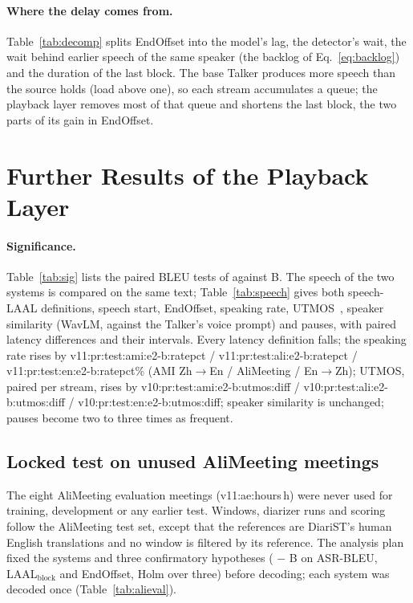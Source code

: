 \paragraph{Where the delay comes from.} Table~\ref{tab:decomp} splits EndOffset into the model's lag, the detector's
wait, the wait behind earlier speech of the same speaker (the backlog of Eq.~\eqref{eq:backlog}) and the duration of the
last block. The base Talker produces more speech than the source holds (load above one), so each stream accumulates a
queue; the playback layer removes most of that queue and shortens the last block, the two parts of its gain in
EndOffset.



\section{Further Results of the Playback Layer}
\label{app:sig10}
\label{app:postreview}

\paragraph{Significance.} Table~\ref{tab:sig} lists the paired BLEU tests of \sys{} against B. The speech of the two
systems is compared on the same text; Table~\ref{tab:speech} gives both speech-LAAL definitions, speech start,
EndOffset, speaking rate, UTMOS~\citep{saeki2022utmos}, speaker similarity (WavLM, against the Talker's voice prompt)
and pauses, with paired latency differences and their intervals. Every latency definition falls; the speaking rate rises
by \num{v11:pr:test:ami:e2-b:ratepct} / \num{v11:pr:test:ali:e2-b:ratepct} / \num{v11:pr:test:en:e2-b:ratepct}\%
(AMI Zh$\rightarrow$En / AliMeeting / En$\rightarrow$Zh); UTMOS, paired per stream, rises by
\num{v10:pr:test:ami:e2-b:utmos:diff} / \num{v10:pr:test:ali:e2-b:utmos:diff} / \num{v10:pr:test:en:e2-b:utmos:diff};
speaker similarity is unchanged; pauses become two to three times as frequent.




\ifAliEval
\subsection{Locked test on unused AliMeeting meetings}
\label{app:alieval}
The eight AliMeeting evaluation meetings (\num{v11:ae:hours}\,h) were never used for training, development or any
earlier test. Windows, diarizer runs and scoring follow the AliMeeting test set, except that the references are
DiariST's human English translations and no window is filtered by its reference. The analysis plan fixed the systems
and three confirmatory hypotheses (\sys{} $-$ B on ASR-BLEU, LAAL$_\text{block}$ and EndOffset, Holm over three)
before decoding; each system was decoded once (Table~\ref{tab:alieval}).

\fi

